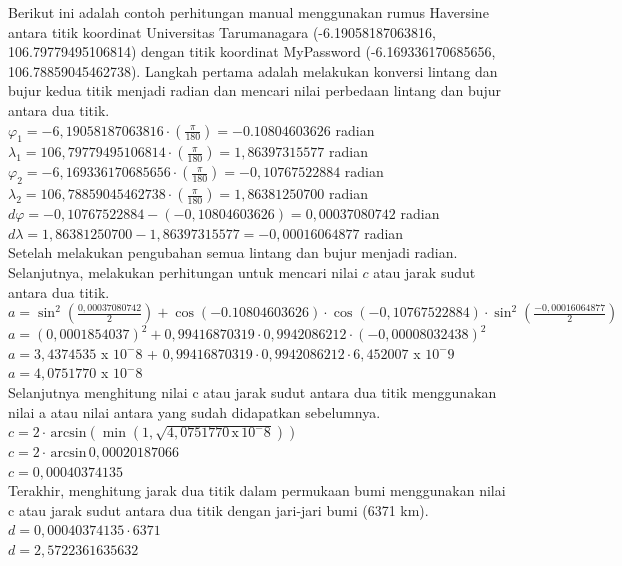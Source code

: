Berikut ini adalah contoh perhitungan manual menggunakan rumus Haversine antara titik koordinat Universitas Tarumanagara (-6.19058187063816, 106.79779495106814) dengan titik koordinat MyPassword (-6.169336170685656, 106.78859045462738). Langkah pertama adalah melakukan konversi lintang dan bujur kedua titik menjadi radian dan mencari nilai perbedaan lintang dan bujur antara dua titik.
\\
$\varphi_1 = -6,19058187063816 \cdot \left( \frac{\pi}{180} \right) = -0.10804603626 $ radian 
\\
$\lambda_1 = 106,79779495106814 \cdot \left( \frac{\pi}{180} \right) = 1,86397315577 $ radian
\\
$\varphi_2 = -6,169336170685656 \cdot \left( \frac{\pi}{180} \right) = -0,10767522884 $ radian
\\
$\lambda_2 = 106,78859045462738 \cdot \left( \frac{\pi}{180} \right) = 1,86381250700 $ radian
\\
$d\varphi = -0,10767522884 - (-0,10804603626) = 0,00037080742 $ radian
\\
$d\lambda = 1,86381250700 - 1,86397315577 = -0,00016064877 $ radian
\\


Setelah melakukan pengubahan semua lintang dan bujur menjadi radian. Selanjutnya, melakukan perhitungan untuk mencari nilai $c$ atau jarak sudut antara dua titik.
\\
$a = \sin^2 \left( \frac{0,00037080742}{2} \right) + \cos(-0.10804603626) \cdot \cos(-0,10767522884) \cdot \sin^2 \left( \frac{-0,00016064877}{2} \right)$
\\
$a = (0,0001854037)^2 + 0,99416870319 \cdot 0,9942086212 \cdot  (-0,00008032438)^2 $
\\
$a = 3,4374535 $ x $10^-8$ + $0,99416870319 \cdot 0,9942086212 \cdot 6,452007$ x $10^-9 $
\\
$a = 4,0751770 $ x $ 10^-8 $
\\


Selanjutnya menghitung nilai c atau jarak sudut antara dua titik menggunakan nilai a atau nilai antara yang sudah didapatkan sebelumnya.
\\
$c = 2 \cdot \, \text{arcsin} \left( \min(1, \sqrt{4,0751770 \, \text{x} \, 10^-8}) \right)$
\\
$c = 2 \cdot \, \text{arcsin} \, 0,00020187066 $
\\
$c = 0,00040374135 $
\\

Terakhir, menghitung jarak dua titik dalam permukaan bumi menggunakan nilai c atau jarak sudut antara dua titik dengan jari-jari bumi (6371 km).
\\
$d = 0,00040374135 \cdot 6371 $
\\
$d = 2,5722361635632 $
\\


